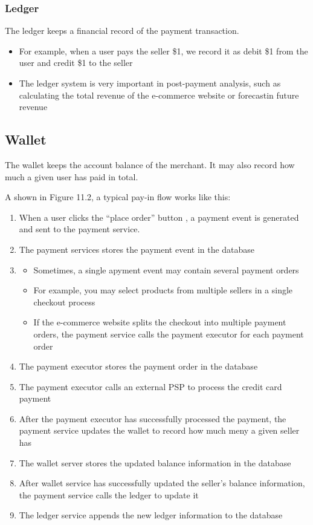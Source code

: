 \documentclass{report}
\theoremstyle{definition}
\let\oldsubsection\subsection
\let\oldsubsubsection\subsubsection
\renewcommand{\subsection}{\oldsubsection*}
\renewcommand{\subsubsection}{\oldsubsubsection*}
\begin{document}
\subsubsection{Ledger}

The ledger keeps a financial record of the payment transaction.

\begin{itemize}
\item
For example, when a user pays the seller \$1, we record it as debit \$1 from the user and credit \$1 to the seller
\item
The ledger system is very important in post-payment analysis, such as calculating the total revenue of the e-commerce website or forecastin future revenue
\end{itemize}

\subsection{Wallet}

The wallet keeps the account balance of the merchant. It may also record how much a given user has paid in total.

A shown in Figure 11.2, a typical pay-in flow works like this:

\begin{enumerate}
\item
When a user clicks the ``place order'' button , a payment event is generated and sent to the payment service.

\item
The payment services stores the payment event in the database
\item
\begin{itemize}
\item
Sometimes, a single apyment event may contain several payment orders
\item
For example, you may select products from multiple sellers in a single checkout process
\item
If the e-commerce website splits the checkout into multiple payment orders, the payment service calls the payment executor for each payment order
\end{itemize}
\item
The payment executor stores the payment order in the database
\item
The payment executor calls an external PSP to process the credit card payment
\item
After the payment executor has successfully processed the payment, the payment service updates the wallet to record how much meny a given seller has
\item
The wallet server stores the updated balance information in the database
\item
After wallet service has successfully updated the seller's balance information, the payment service calls the ledger to update it
\item
The ledger service appends the new ledger information to the database
\end{enumerate}
\end{document}
